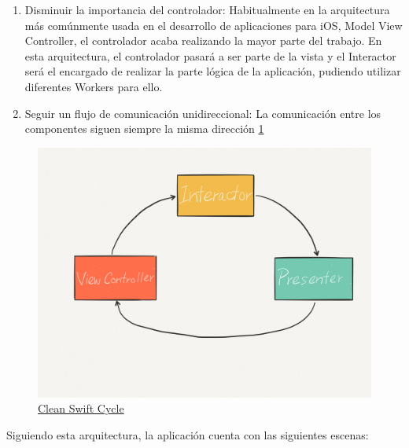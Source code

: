 \documentclass[../main.tex]{subfiles}
\begin{document}
\begin{enumerate}
    \item Disminuir la importancia del controlador: Habitualmente en la arquitectura más comúnmente usada en el desarrollo de aplicaciones para iOS, Model View Controller,  el controlador acaba realizando la mayor parte del trabajo. En esta arquitectura, el controlador pasará a ser parte de la vista y el Interactor será el encargado de realizar la parte lógica de la aplicación, pudiendo utilizar diferentes Workers para ello.
    \item Seguir un flujo de comunicación unidireccional: La comunicación entre los componentes siguen siempre la misma dirección \ref{figure19} 
\end{enumerate}


\begin{figure}
    \centering
    \includegraphics[width=1\textwidth]{images/interpreter/VIP-Cycle.png}
    \caption{\href{http://clean-swift.com/wp-content/uploads/2015/08/VIP-Cycle.png}{Clean Swift Cycle}}
    \label{figure19}
\end{figure}

Siguiendo esta arquitectura, la aplicación cuenta con las siguientes escenas:
\end{document}
